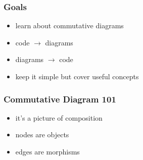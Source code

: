 \documentclass[include/preamble.tex]{subfiles}
\begin{document}
\begin{frame}
  \frametitle{Goals}
  \begin{itemize}
  \item learn about commutative diagrams
    \pause
  \item code $\rightarrow$ diagrams
    \pause
  \item diagrams $\rightarrow$ code
    \pause
  \item keep it simple but cover useful concepts
  \end{itemize}
\end{frame}

\begin{frame}
  \begin{figure}
    \begin{center}
    \end{center}
  \end{figure}
\end{frame}

\begin{frame}
  \frametitle{Commutative Diagram 101}
  \begin{itemize}
  \item it's a picture of composition
  \item nodes are objects
  \item edges are morphisms
  \end{itemize}
\end{frame}



\begin{frame}
  \begin{center}
  \end{center}
\end{frame}
\end{document}

